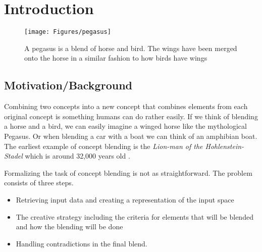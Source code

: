
\chapter{Introduction} %

\label{Chapter1} %


\newcommand{\keyword}[1]{\textbf{#1}}
\newcommand{\tabhead}[1]{\textbf{#1}}
\newcommand{\code}[1]{\texttt{#1}}
\newcommand{\file}[1]{\texttt{\bfseries#1}}
\newcommand{\option}[1]{\texttt{\itshape#1}}


\begin{figure}
\centering
\texttt{[image: Figures/pegasus]}
\caption{A pegasus is a blend of horse and bird. The wings have been merged onto the horse in a similar fashion to how birds have wings }
\label{fig:pegasus}
\end{figure}


\section{Motivation/Background}
Combining two concepts into a new concept that combines elements from each original concept is something humans can do rather easily. If we think of blending a horse and a bird, we can easily imagine a winged horse like the mythological Pegasus. Or when blending a car with a boat we can think of an amphibian boat. The earliest example of concept blending is the \emph{Lion-man of the Hohlenstein-Stadel} which is around 32,000 years old \parencite{turner2014origin}.

Formalizing the task of concept blending is not as straightforward. The problem consists of three steps. \begin{itemize}
	\item Retrieving input data and creating a representation of the input space
	\item The creative strategy including the criteria for elements that will be blended and how the blending will be done
	\item Handling contradictions in the final blend.
\end{itemize}

